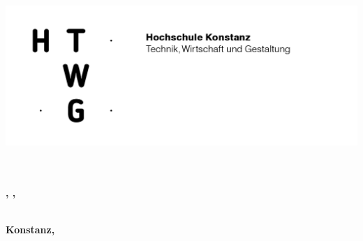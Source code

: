 
\begin{titlepage}

\vspace*{-3.5cm}

\begin{flushleft}
\hspace*{-1cm} \includegraphics[width=15.7cm]{preface/htwg-logo.png}
\end{flushleft}

\vspace{1cm}

\begin{center}
	\large{
		\textbf{\strLecture} \\[2cm]
	}
	\Huge{
		\textbf{\strTopic} \\[2cm]
	}
	\Large{
		\textbf{\strAuthorA, \strAuthorB, \strAuthorC}} \\[3cm]
	\large{
		\textbf{} \\[2.3cm]
	}
	
	\large{
		\textbf{Konstanz, \strDate}
	}
\end{center}

\end{titlepage}
\thispagestyle{empty}

